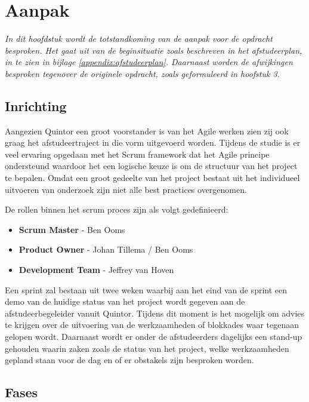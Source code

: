 \chapter{Aanpak}
\label{Aanpak}

\textit{In dit hoofdstuk wordt de totstandkoming van de aanpak voor de opdracht besproken. Het gaat uit van de beginsituatie zoals beschreven in het afstudeerplan, in te zien in bijlage \ref{appendix:afstudeerplan}. Daarnaast worden de afwijkingen besproken tegenover de originele opdracht, zoals geformuleerd in hoofstuk 3.}

\section{Inrichting}

Aangezien Quintor een groot voorstander is van het Agile werken zien zij ook graag het afstudeertraject in die vorm uitgevoerd worden. Tijdens de studie is er veel ervaring opgedaan met het Scrum framework dat het Agile principe ondersteund waardoor het een logische keuze is om de structuur van het project te bepalen. Omdat een groot gedeelte van het project bestaat uit het individueel uitvoeren van onderzoek zijn niet alle best practices overgenomen. 

De rollen binnen het scrum proces \citep{schwaber2011scrum} zijn als volgt gedefinieerd:
\begin{itemize}[noitemsep]
  \item \textbf{Scrum Master} - Ben Ooms
  \item \textbf{Product Owner} - Johan Tillema / Ben Ooms
  \item \textbf{Development Team} - Jeffrey van Hoven
\end{itemize}

Een sprint zal bestaan uit twee weken waarbij aan het eind van de sprint een demo van de huidige status van het project wordt gegeven aan de afstudeerbegeleider vanuit Quintor. Tijdens dit moment is het mogelijk om advies te krijgen over de uitvoering van de werkzaamheden of blokkades waar tegenaan gelopen wordt. Daarnaast wordt er onder de afstudeerders dagelijks een stand-up gehouden waarin zaken zoals de status van het project, welke werkzaamheden gepland staan voor de dag en of er obstakels zijn besproken worden.

\newpage
\section{Fases}

